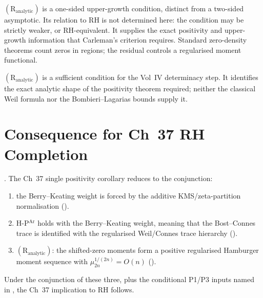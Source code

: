 \begin{remark}
\label{v4-arith:hpar-det:rem:residual-content}
\((\mathrm{R}_{\mathrm{analytic}})\) is a one-sided upper-growth
condition, distinct from a two-sided asymptotic. Its relation to RH is
not determined here: the condition may be strictly weaker, or
RH-equivalent. It supplies the exact
positivity and upper-growth information that Carleman's
criterion requires. Standard zero-density theorems count zeros in regions;
the residual controls a regularised moment functional.
\end{remark}

\begin{remark}
\label{v4-arith:hpar-det:rem:residual-vs-RH}
\((\mathrm{R}_{\mathrm{analytic}})\) is a sufficient condition for the Vol~IV
determinacy step. It identifies the exact analytic shape of
the positivity theorem required; neither the classical Weil formula
nor the Bombieri--Lagarias bounds supply it.
\end{remark}

\section{Consequence for Ch~37 RH Completion}
\label{v4-arith:hpar-det:ch37-consequence}

\begin{theorem}
\label{v4-arith:hpar-det:thm:ch37-consequence}
\ClaimStatusProvedHere. The Ch~37 single positivity corollary
 reduces to the
conjunction:
\begin{enumerate}
\item the Berry--Keating weight is forced by the additive
KMS/zeta-partition normalisation
().
\item H-P\(^{\mathrm{Ar}}\) holds with the Berry--Keating weight,
meaning that the Bost--Connes trace is identified with the
regularised Weil/Connes trace hierarchy
().
\item \((\mathrm{R}_{\mathrm{analytic}})\): the shifted-zero moments
form a positive regularised Hamburger moment sequence with
\(\mu_{2n}^{1/(2n)}=O(n)\)
().
\end{enumerate}
Under the conjunction of these three, plus the conditional P1/P3
inputs named in , the
Ch~37 implication to RH follows.
\end{theorem}

